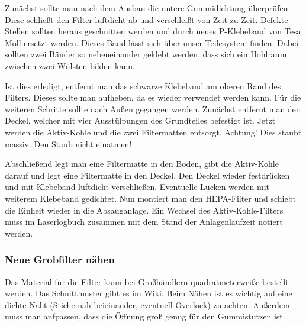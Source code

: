\documentclass{\basedir/fablab-document}
\begin{document}
Zunächst sollte man nach dem Ausbau die untere Gummidichtung überprüfen. Diese schließt den Filter luftdicht ab und verschleißt von Zeit zu Zeit. Defekte Stellen sollten heraus geschnitten werden und durch neues P-Klebeband von Tesa Moll ersetzt werden. Dieses Band lässt sich über unser Teilesystem finden. Dabei sollten zwei Bänder so nebeneinander geklebt werden, dass sich ein Hohlraum zwischen zwei Wülsten bilden kann.

Ist dies erledigt, entfernt man das schwarze Klebeband am oberen Rand des Filters. Dieses sollte man aufheben, da es wieder verwendet werden kann. Für die weiteren Schritte sollte nach Außen gegangen werden. Zunächst entfernt man den Deckel, welcher mit vier Ausstülpungen des Grundteiles befestigt ist. Jetzt werden die Aktiv-Kohle und die zwei Filtermatten entsorgt. Achtung! Dies staubt massiv. Den Staub nicht einatmen!

Abschließend legt man eine Filtermatte in den Boden, gibt die Aktiv-Kohle darauf und legt eine Filtermatte in den Deckel. Den Deckel wieder festdrücken und mit Klebeband luftdicht verschließen. Eventuelle Lücken werden mit weiterem Klebeband gedichtet. Nun montiert man den HEPA-Filter und schiebt die Einheit wieder in die Absauganlage.
Ein Wechsel des Aktiv-Kohle-Filters muss im Laserlogbuch zusammen mit dem Stand der Anlagenlaufzeit notiert werden.
\subsubsection{Neue Grobfilter nähen}
Das Material für die Filter kann bei Großhändlern quadratmeterweiße bestellt werden. Das Schnittmuster gibt es im Wiki. Beim Nähen ist es wichtig auf eine dichte Naht (Stiche nah beieinander, eventuell Overlock) zu achten. Außerdem muss man aufpassen, dass die Öffnung groß genug für den Gummistutzen ist.
\end{document}
